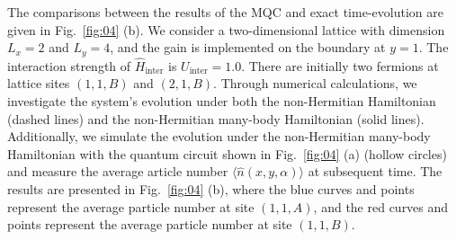 \documentclass[longbibliography, aps, prx, amsmath, amssymb, amsfonts, twocolumn,superscriptaddress, footinbib]{revtex4-1}
\begin{document}
	The comparisons between the results of the MQC and exact time-evolution are given in Fig.~\ref{fig:04} (b). 
	We consider a two-dimensional lattice with dimension $L_x=2$ and $L_y=4$, and the gain is implemented on the boundary at $y=1$. The interaction strength of $\hat{H}_{\text{inter}}$ is $U_{\text{inter}}=1.0$.
	There are initially two fermions at lattice sites $(1,1,B)$ and $(2,1,B)$. Through numerical calculations, we investigate the system's evolution under both the non-Hermitian Hamiltonian (dashed lines) and the non-Hermitian many-body Hamiltonian (solid lines). Additionally, we simulate the evolution under the non-Hermitian many-body Hamiltonian with the quantum circuit shown in Fig.~\ref{fig:04} (a) (hollow circles) and measure the average article number $\langle \hat{n}(x,y,\alpha)\rangle$ at subsequent time. The results are presented in Fig.~\ref{fig:04} (b), where the blue curves and points represent the average particle number at site $(1,1,A)$, and the red curves and points represent the average particle number at site $(1,1,B)$.
\end{document}
